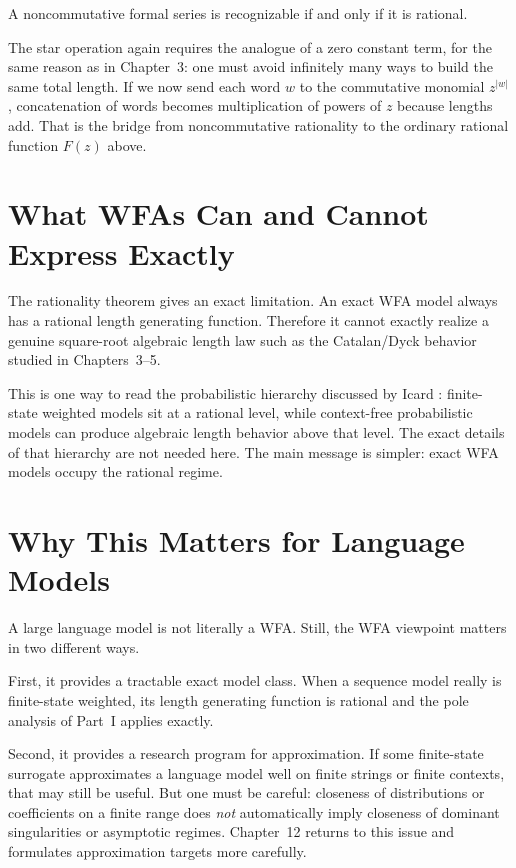 \begin{theorem}
A noncommutative formal series is recognizable if and only if it is rational.
\end{theorem}

The star operation again requires the analogue of a zero constant term, for the same reason as in Chapter~3: one must avoid infinitely many ways to build the same total length. If we now send each word $w$ to the commutative monomial $z^{|w|}$, concatenation of words becomes multiplication of powers of $z$ because lengths add. That is the bridge from noncommutative rationality to the ordinary rational function $F(z)$ above.

\section{What WFAs Can and Cannot Express Exactly}

The rationality theorem gives an exact limitation. An exact WFA model always has a rational length generating function. Therefore it cannot exactly realize a genuine square-root algebraic length law such as the Catalan/Dyck behavior studied in Chapters~3--5.

This is one way to read the probabilistic hierarchy discussed by Icard \cite{Icard2020}: finite-state weighted models sit at a rational level, while context-free probabilistic models can produce algebraic length behavior above that level. The exact details of that hierarchy are not needed here. The main message is simpler: exact WFA models occupy the rational regime.

\section{Why This Matters for Language Models}

A large language model is not literally a WFA. Still, the WFA viewpoint matters in two different ways.

First, it provides a tractable exact model class. When a sequence model really is finite-state weighted, its length generating function is rational and the pole analysis of Part~I applies exactly.

Second, it provides a research program for approximation. If some finite-state surrogate approximates a language model well on finite strings or finite contexts, that may still be useful. But one must be careful: closeness of distributions or coefficients on a finite range does \emph{not} automatically imply closeness of dominant singularities or asymptotic regimes. Chapter~12 returns to this issue and formulates approximation targets more carefully.

